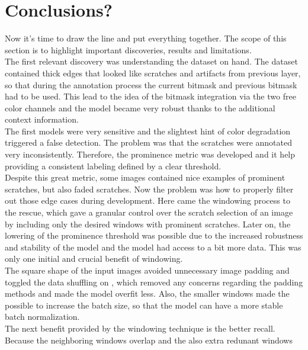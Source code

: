 \section{Conclusions?}
Now it's time to draw the line and put everything together. The scope of this section is to highlight important discoveries, results and limitations. \\
The first relevant discovery was understanding the dataset on hand. The dataset contained thick edges that looked like scratches and artifacts from previous layer, so that during the annotation process the current bitmask and previous bitmask had to be used. This lead to the idea of the bitmask integration via the two free color channels and the model became very robust thanks to the additional context information. \\
The first models were very sensitive and the slightest hint of color degradation triggered a false detection. The problem was that the scratches were annotated very inconsistently. Therefore, the prominence metric was developed and it help providing a consistent labeling defined by a clear threshold.\\
Despite this great metric, some images contained nice examples of prominent scratches, but also faded scratches. Now the problem was how to properly filter out those edge cases during development. Here came the windowing process to the rescue, which gave a granular control over the scratch selection of an image by including only the desired windows with prominent scratches. Later on, the lowering of the prominence threshold was possible due to the increased robustness and stability of the model and the model had access to a bit more data. This was only one initial and crucial benefit of windowing. \\
The square shape of the input images avoided unnecessary image padding and toggled the data shuffling on , which removed any concerns regarding the padding methods and made the model overfit less. Also, the smaller windows made the possible to increase the batch size, so that the model can have a more stable batch normalization. \\
The next benefit provided by the windowing technique is the better recall. Because the neighboring windows overlap and the also extra redunant windows
